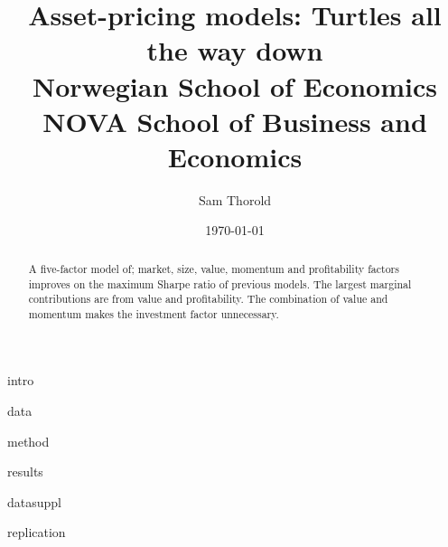 \documentclass[a4paper, 12pt]{article}
\title{
  {Asset-pricing models: Turtles all the way down}\\
  {\large Norwegian School of Economics}\\
  {\large NOVA School of Business and Economics}
}
\author{Sam Thorold}
\date{\today}
\begin{document}
\maketitle

\begin{abstract}
  A five-factor model of; market, size,  value, momentum and profitability 
  factors improves on the maximum Sharpe ratio of previous models. The largest 
  marginal contributions are from value and profitability. The combination of 
  value and momentum makes the investment factor unnecessary.
\end{abstract}

{intro}


{data}

{method}

{results}

\printbibliography

\appendix

{datasuppl}

{replication}
\end{document}
